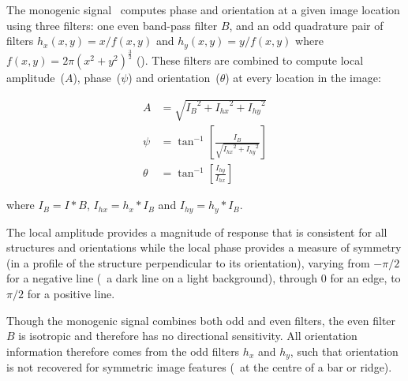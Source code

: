 \label{s:filtering_monogenic}
%
%

%
The monogenic signal~\cite{Felsberg_Sommer_TSP01} computes phase and orientation at a given image location using three filters: one even band-pass filter $B$, and an odd quadrature pair of filters $h_x(x,y) = x/f(x,y)$ and $h_y(x,y) = y/f(x,y)$ where $f(x,y) = 2\pi(x^2 + y^2)^{\frac{3}{2}}$ (). These filters are combined to compute local amplitude~($A$), phase~($\psi$) and orientation~($\theta$) at every location in the image:

\begin{align}
A       &= \sqrt{{I_B}^2 + {I_{hx}}^2 + {I_{hy}}^2} 
\label{e:monogenic_amplitude} \\
%
\psi	  &= \tan^{-1}\left[ \frac{I_B}{\sqrt{{I_{hx}}^2 + {I_{hy}}^2}} \right]
\label{e:monogenic_phase} \\
%
\theta  &= \tan^{-1}\left[ \frac{I_{hy}}{I_{hx}} \right] 
\label{e:monogenic_orientation}
\end{align}

\noindent where $I_B = I \ast B$, $I_{hx} = h_x \ast I_B$ and $I_{hy} = h_y \ast I_B$.

The local amplitude provides a magnitude of response that is consistent for all structures and orientations while the local phase provides a measure of symmetry (in a profile of the structure perpendicular to its orientation), varying from $-\pi/2$ for a negative line (\ie~a dark line on a light background), through $0$ for an edge, to $\pi/2$ for a positive line.

Though the monogenic signal combines both odd and even filters, the even filter $B$ is isotropic and therefore has no directional sensitivity. All orientation information therefore comes from the odd filters $h_x$ and $h_y$, such that orientation is not recovered for symmetric image features (\eg~at the centre of a bar or ridge).
